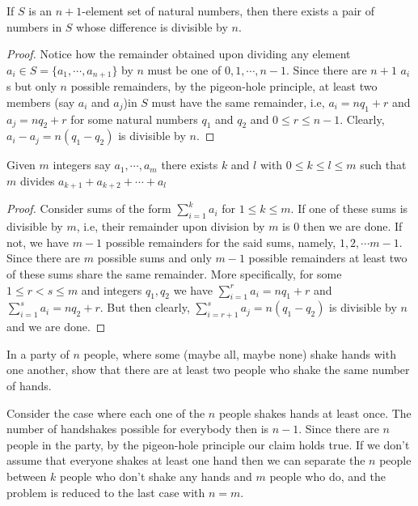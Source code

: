 \begin{claim}
If $S$ is an $n+1$-element set of natural numbers, then there exists a pair of numbers in $S$ whose difference is divisible by $n$.
\end{claim}
\begin{proof}
Notice how the remainder obtained upon dividing any element $a_i\in S=\{a_1,\cdots,a_{n+1}\}$ by $n$ must be one of $0,1,\cdots,n-1$. Since there are $n+1$ $a_i$s but only $n$ possible remainders, by the pigeon-hole principle, at least two members (say $a_i$ and $a_j$)in $S$ must have the same remainder, i.e, $a_i = nq_1 + r$ and $a_j = nq_2 + r$ for some natural numbers $q_1$ and $q_2$ and $0\leq r\leq n-1$. Clearly, $a_i-a_j = n(q_1-q_2)$ is divisible by $n$.
\end{proof}
\begin{claim}
Given $m$ integers say $a_{1},\cdots,a_{m}$ there exists $k$ and $l$ with  $0\leq k\leq l\leq m$ such that $m$ divides $a_{k+1}+a_{k+2}+\cdots+a_{l}$
\end{claim}
\begin{proof}
Consider sums of the form $\sum_{i=1}^{k}a_i$ for $1\leq k\leq m$. If one of these sums is divisible by $m$, i.e, their remainder upon division by $m$ is $0$ then we are done. If not, we have $m-1$ possible remainders for the said sums, namely, $1,2,\cdots m-1$. Since there are $m$ possible sums and only $m-1$ possible remainders at least two of these sums share the same remainder. More specifically, for some $1\leq r<s\leq m$ and integers $q_1,q_2$ we have $\sum_{i=1}^{r}a_i = nq_1 + r$ and $\sum_{i=1}^{s}a_i = nq_2 + r$. But then clearly, $\sum_{i=r+1}^{s}a_j = n(q_1-q_2)$ is divisible by $n$ and we are done.
\end{proof}
\begin{question}
In a party of $n$ people, where some (maybe all, maybe none) shake hands with one another, show that there are at least two people who shake the same number of hands.
\end{question}
\begin{solution}
Consider the case where each one of the $n$ people shakes hands at least once. The number of handshakes possible for everybody then is $n-1$. Since there are $n$ people in the party, by the pigeon-hole principle our claim holds true. If we don't assume that everyone shakes at least one hand then we can separate the $n$ people between $k$ people who don't shake any hands and $m$ people who do, and the problem is reduced to the last case with $n=m$.
\end{solution}
